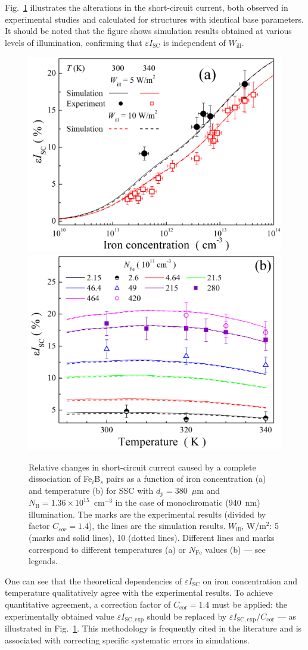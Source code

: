 \documentclass[a4paper,fleqn]{cas-sc}
\begin{document}
Fig.~\ref{fig5} illustrates the alterations in the short-circuit current,
both observed in experimental studies and calculated for structures with identical base parameters.
It should be noted that the figure shows simulation results obtained at various levels of illumination,
confirming that $\varepsilon I_\mathrm{SC}$ is independent of $W_\mathrm{ill}$.


\begin{figure}
	\centering
     \includegraphics[width=0.4\linewidth]{Fig5a.png}
     \includegraphics[width=0.4\linewidth]{Fig5b.png}
	  \caption{Relative changes in short-circuit current caused by a complete
       dissociation of Fe$_i$B$_s$ pairs as a function of iron concentration (a) and
       temperature (b) for SSC with $d_p=380$~$\mu$m and $N_\mathrm{B}=1.36\times10^{15}$~cm$^{-3}$
       in the case of monochromatic (940~nm) illumination.
       The marks are the experimental results (divided by factor $C_{cor}=1.4$), the lines are the simulation results.
       $W_\mathrm{ill}$, W/m$^{2}$: 5 (marks and solid lines), 10 (dotted lines).
       Different lines and marks correspond to different temperatures (a) or $N_\mathrm{Fe}$ values (b) --- see legends.
}\label{fig5}
\end{figure}

One can see that the theoretical dependencies of $\varepsilon I_\mathrm{SC}$
on iron concentration and temperature qualitatively agree with the experimental results.
To achieve quantitative agreement, a correction factor of $C_\mathrm{cor} = 1.4$ must be applied:
the experimentally obtained value $\varepsilon I_\mathrm{SC,exp}$ should be replaced by $\varepsilon I_\mathrm{SC,exp} / C_\mathrm{cor}$ --- as illustrated in Fig.~\ref{fig5}.
This methodology is frequently cited in the literature \cite{IronSC} and is associated with correcting specific systematic errors in simulations.
\end{document}
